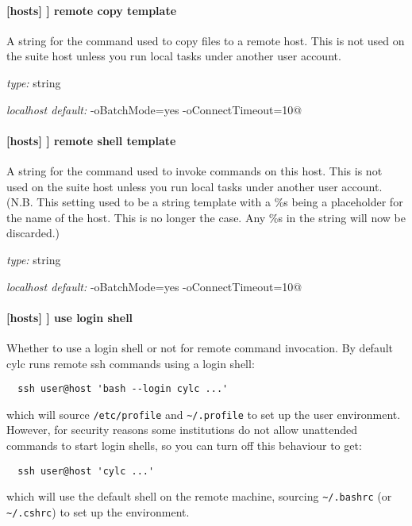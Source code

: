 \paragraph[remote copy template]{[hosts] \textrightarrow [[HOST]] \textrightarrow remote copy template }

A string for the command used to copy files to a remote host. This is not used
on the suite host unless you run local tasks under another user account.

\begin{myitemize}
\item {\em type:} string
\item {\em localhost default:} \lstinline@scp -oBatchMode=yes -oConnectTimeout=10@
\end{myitemize}

\paragraph[remote shell template]{[hosts] \textrightarrow [[HOST]] \textrightarrow remote shell template }

A string for the command used to invoke commands on this host.
This is not used on the suite host unless you run local tasks under
another user account. (N.B. This setting used to be a string template with a \%s
being a placeholder for the name of the host. This is no longer the case. Any
\%s in the string will now be discarded.)

\begin{myitemize}
\item {\em type:} string
\item {\em localhost default:} \lstinline@ssh -oBatchMode=yes -oConnectTimeout=10@
\end{myitemize}

\paragraph[use login shell]{[hosts] \textrightarrow [[HOST]] \textrightarrow use login shell }

Whether to use a login shell or not for remote command invocation. By
default cylc runs remote ssh commands using a login shell:
\begin{lstlisting}
  ssh user@host 'bash --login cylc ...'
\end{lstlisting}
which will source \lstinline=/etc/profile= and
\lstinline=~/.profile= to set up the user environment.  However, for
security reasons some institutions do not allow unattended commands to
start login shells, so you can turn off this behaviour to get:
\begin{lstlisting}
  ssh user@host 'cylc ...'
\end{lstlisting}
which will use the default shell on the remote machine,
sourcing \lstinline=~/.bashrc= (or \lstinline=~/.cshrc=) to set up the
environment.

